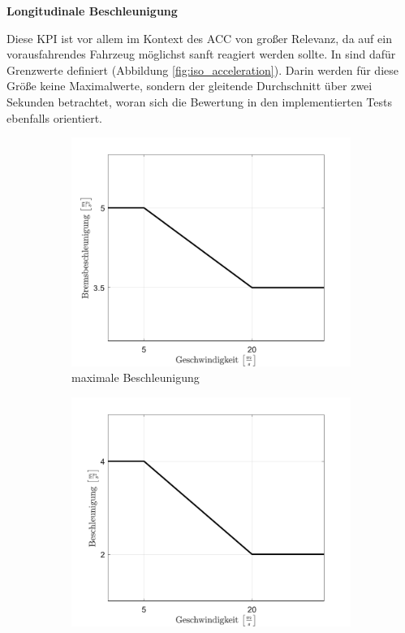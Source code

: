 \bigskip\noindent\textbf{Longitudinale Beschleunigung}

\noindent Diese KPI ist vor allem im Kontext des ACC von großer Relevanz, da auf ein vorausfahrendes Fahrzeug möglichst sanft reagiert werden sollte. In \cite{ISO15622} sind dafür Grenzwerte definiert (Abbildung \ref{fig:iso_acceleration}). Darin werden für diese Größe keine Maximalwerte, sondern der gleitende Durchschnitt über zwei Sekunden betrachtet, woran sich die Bewertung in den implementierten Tests ebenfalls orientiert.
\begin{figure}[H]
    \centering
    \hspace*{\fill}
    \begin{subfigure}[b]{.4\textwidth}
        \centering
        \includegraphics[width=\textwidth]{figures/3_Implementierung/max_acceleration.pdf}
        \caption{maximale Beschleunigung}
        \label{fig:max_acceleration}
    \end{subfigure}
    \hfill
    \begin{subfigure}[b]{.4\textwidth}
        \centering
        \includegraphics[width=\textwidth]{figures/3_Implementierung/max_deceleration.pdf}

\end{subfigure}
\end{figure}
